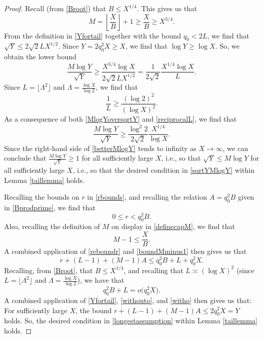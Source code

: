 \documentclass[12pt]{article}
\begin{document}
\begin{proof}
 Recall (from \eqref{Broot}) that $B \leq X^{1/4}$. This gives us that 
\begin{equation}\label{MXthreequarters}
 M = \left\lfloor \frac{X}{B} \right\rfloor + 1 \geq \frac{X}{B} \geq X^{3/4}. 
\end{equation}
 From the definition in \eqref{Yfortail} together with the bound $q_0 < 2 L$, we find that 
 $ \sqrt{Y} \leq 2 \sqrt{2} L X^{1/2}$. 
 Since $Y = 2 q_0^2 X \geq X$, we find that $\log Y \geq \log X$. So, we obtain the lower bound
\begin{equation}\label{MlogYoversqrtY}
 \frac{M \log Y}{\sqrt{Y}} \geq \frac{X^{3/4} \log X}{2 \sqrt{2} L X^{1/2}} = \frac{1}{2\sqrt{2}} \frac{X^{1/4} \log X}{L}. 
\end{equation}
 Since $L = \lfloor \Lambda^{2} \rfloor$ and $\Lambda = \frac{\log X}{\log 2}$, we find that 
\begin{equation}\label{reciprocalL} 
 \frac{1}{L} \geq \frac{ (\log 2)^{2} }{ (\log X)^2 }. 
\end{equation}
 As a consequence of both \eqref{MlogYoversqrtY} and \eqref{reciprocalL}, we find that 
\begin{equation}\label{betterMlogY} 
 \frac{M \log Y}{\sqrt{Y}} \geq \frac{\log^2 2}{2\sqrt{2}} \frac{X^{1/4}}{\log X}. 
\end{equation}
 Since the right-hand side of \eqref{betterMlogY} tends to infinity as $X \to \infty$, we can conclude that $\frac{M \log Y}{\sqrt{Y}} \geq 
 1$ for all sufficiently large $X$, i.e., so that $\sqrt{Y} \leq M \log Y$ for all sufficiently large $X$, i.e., 
 so that the desired condition in \eqref{sqrtYMlogY} within Lemma \ref{taillemma} holds. 

 Recalling the bounds on $r$ in \eqref{rbounds}, and recalling the relation $A = q_0^2 B$  given in \eqref{Bprodprime},  we find that 
\begin{equation}\label{reboundr} 
 0 \leq r < q_0^2 B.
\end{equation}
 Also, recalling the definition of $M$ on display in \eqref{definecapM}, 
 we find that 
\begin{equation}\label{boundMminus1}
 M - 1 \leq \frac{X}{B}. 
\end{equation}
 A combined application of \eqref{reboundr} and \eqref{boundMminus1} then gives us that 
\begin{equation}\label{withouto} 
 r + (L-1) + (M-1) A \leq q_0^2 B + L + q_0^2 X. 
\end{equation}
 Recalling, from \eqref{Broot}, that $B \leq X^{1/4}$, and recalling that $L \asymp (\log X)^{2}$
 (since $L = \lfloor \Lambda^{2} \rfloor$ and $\Lambda = \frac{\log X}{\log 2}$), we have that 
\begin{equation}\label{witho} 
 q_0^2 B + L = o\big( q_0^2 X \big). 
\end{equation}
 A combined application of \eqref{Yfortail}, \eqref{withouto}, and \eqref{witho} then 
  gives us that: For sufficiently large $X$, the bound
 $ r + (L-1) + (M-1) A \leq 2 q_0^2 X = Y $
 holds. So, the desired condition in \eqref{longestassumption} within 
 Lemma \ref{taillemma} holds. 
 

\end{proof}
\end{document}
